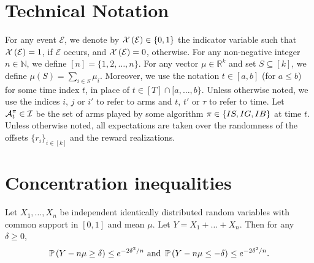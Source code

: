 \section{Technical Notation} \label{appendix:notation}

For any event $\mathcal{E}$, we denote by $\mathop{\mathcal{X}\left(\mathcal{E}\right)} \in \{0,1\}$ the indicator variable such that $\mathop{\mathcal{X}\left(\mathcal{E}\right)} = 1$, if $\mathcal{E}$ occurs, and $\mathop{\mathcal{X}\left(\mathcal{E}\right)} = 0$, otherwise. For any non-negative integer $n \in \mathbb{N}$, we define $[n] = \{1,2, \dots, n\}$. For any vector $\mu \in \mathbb{R}^k$ and set $S \subseteq [k]$, we define $\mu(S) = \sum_{i \in S} \mu_i$. Moreover, we use the notation $t \in [a, b]$ (for $a \leq b$) for some time index $t$, in place of $t \in [T] \cap [a, \ldots , b\}$. Unless otherwise noted, we use the indices $i$, $j$ or $i'$ to refer to arms and $t$, $t'$ or $\tau$ to refer to time. Let $\operatorname{\mathcal{A}}^{\pi}_t \in \operatorname{\mathcal{I}}$ be the set of arms played by some algorithm $\pi \in \{IS, IG, IB\}$ at time $t$. Unless otherwise noted, all expectations are taken over the randomness of the offsets $\{r_i\}_{i \in [k]}$ and the reward realizations.

\section{Concentration inequalities}
\begin{theorem}\label{appendix:concentration:hoeffding}
Let $X_1, \dots, X_n$ be independent identically distributed random variables with common support in $[0,1]$ and mean $\mu$. Let $Y = X_1 + \dots + X_n$. Then for any $\delta \geq 0$,
\begin{align*}
    \mathop{\mathbb{P}\left(Y-n\mu \geq \delta\right)} \leq e^{-2\delta^2/n} \text{   and   }\mathop{\mathbb{P}\left(Y-n\mu \leq -\delta\right)} \leq e^{-2\delta^2/n}.
\end{align*}
\end{theorem}